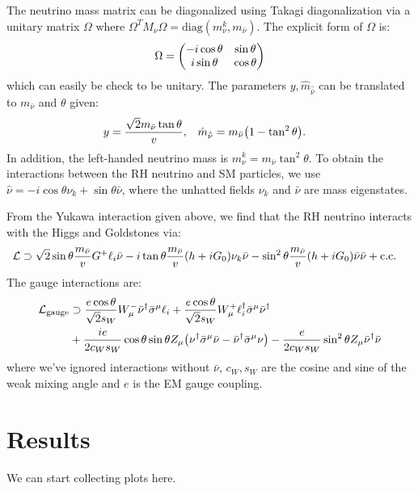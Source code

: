 \documentclass[a4paper,11pt]{article} \pdfoutput=1
\newcommand{\rhn}{\bar{\nu}}
\begin{document}
The neutrino mass matrix can be diagonalized using Takagi diagonalization via a
unitary matrix \(\Omega\) where
\(\Omega^{T}M_{\nu}\Omega = \mathrm{diag}(m^{k}_{\nu}, m_{\rhn})\). The
explicit form of \(\Omega\) is:
\begin{align}
	\Omega = \mqty(-i\cos\theta & \sin\theta \\ i\sin\theta & \cos\theta)
\end{align}
which can easily be check to be unitary. The parameters
\(y, \hat{m}_{\hat{\rhn}}\) can be translated to \(m_{\rhn}\) and \(\theta\)
given:
\begin{align}
	y & = \frac{\sqrt{2}m_{\rhn}\tan\theta}{v}, & \hat{m}_{\hat{\rhn}} & = m_{\rhn}\qty(1-\tan^2\theta).
\end{align}
In addition, the left-handed neutrino mass is \(m^{k}_{\nu} = m_{\rhn}\tan^2\theta\).
To obtain the interactions between the RH neutrino and SM particles, we use
\(\hat{\nu} = -i\cos\theta\nu_{k} + \sin\theta\rhn\), where the unhatted
fields \(\nu_{k}\) and \(\rhn\) are mass eigenstates.

From the Yukawa interaction given above, we find that the RH neutrino interacts
with the Higgs and Goldstones via:
\begin{align}
	\mathcal{L} & \supset
	\sqrt{2}\sin\theta\frac{m_{\rhn}}{v}G^{+}\ell_{i}\rhn
	-i\tan\theta\frac{m_{\rhn}}{v}\qty(h+iG_{0})\nu_{k}\rhn
	- \sin^2\theta \frac{m_{\rhn}}{v}(h+iG_{0})\rhn\rhn
	+ \mathrm{c.c.}
\end{align}
The gauge interactions are:
\begin{align}
	\mathcal{L}_{\mathrm{gauge}}
	 & \supset
	\frac{e\cos\theta}{\sqrt{2}s_{W}}W^{-}_{\mu}\rhn^{\dagger}\bar{\sigma}^{\mu}\ell_i +
	\frac{e\cos\theta}{\sqrt{2}s_{W}}W^{+}_{\mu}\ell^{\dagger}_i\bar{\sigma}^{\mu}\rhn^{\dagger} \\
	 & +\frac{ie}{2c_{W}s_{W}}\cos\theta\sin\theta Z_{\mu}
	\qty(
	\nu^{\dagger}\bar{\sigma}^{\mu}\rhn
	-\rhn^{\dagger}\bar{\sigma}^{\mu}\nu
	)
	-\frac{e}{2c_{W}s_{W}}\sin^2\theta Z_{\mu}\rhn^{\dagger}\rhn
	\notag
\end{align}
where we've ignored interactions without \(\rhn\), \(c_{W},s_{W}\) are the cosine and sine of the
weak mixing angle and \(e\) is the EM gauge coupling.


\section{Results}
\label{sec:results}
We can start collecting plots here.
\end{document}

